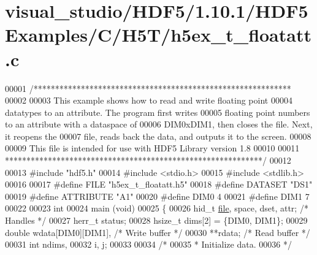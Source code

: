 \hypertarget{visual__studio_2_h_d_f5_21_810_81_2_h_d_f5_examples_2_c_2_h5_t_2h5ex__t__floatatt_8c_source}{}\section{visual\+\_\+studio/\+H\+D\+F5/1.10.1/\+H\+D\+F5\+Examples/\+C/\+H5\+T/h5ex\+\_\+t\+\_\+floatatt.c}
\label{visual__studio_2_h_d_f5_21_810_81_2_h_d_f5_examples_2_c_2_h5_t_2h5ex__t__floatatt_8c_source}

\begin{DoxyCode}
00001 \textcolor{comment}{/************************************************************}
00002 \textcolor{comment}{}
00003 \textcolor{comment}{  This example shows how to read and write floating point}
00004 \textcolor{comment}{  datatypes to an attribute.  The program first writes}
00005 \textcolor{comment}{  floating point numbers to an attribute with a dataspace of}
00006 \textcolor{comment}{  DIM0xDIM1, then closes the file.  Next, it reopens the}
00007 \textcolor{comment}{  file, reads back the data, and outputs it to the screen.}
00008 \textcolor{comment}{}
00009 \textcolor{comment}{  This file is intended for use with HDF5 Library version 1.8}
00010 \textcolor{comment}{}
00011 \textcolor{comment}{ ************************************************************/}
00012 
00013 \textcolor{preprocessor}{#include "hdf5.h"}
00014 \textcolor{preprocessor}{#include <stdio.h>}
00015 \textcolor{preprocessor}{#include <stdlib.h>}
00016 
00017 \textcolor{preprocessor}{#define FILE            "h5ex\_t\_floatatt.h5"}
00018 \textcolor{preprocessor}{#define DATASET         "DS1"}
00019 \textcolor{preprocessor}{#define ATTRIBUTE       "A1"}
00020 \textcolor{preprocessor}{#define DIM0            4}
00021 \textcolor{preprocessor}{#define DIM1            7}
00022 
00023 \textcolor{keywordtype}{int}
00024 main (\textcolor{keywordtype}{void})
00025 \{
00026     hid\_t       \hyperlink{structfile}{file}, space, dset, attr;            \textcolor{comment}{/* Handles */}
00027     herr\_t      status;
00028     hsize\_t     dims[2] = \{DIM0, DIM1\};
00029     \textcolor{keywordtype}{double}      wdata[DIM0][DIM1],                  \textcolor{comment}{/* Write buffer */}
00030                 **rdata;                            \textcolor{comment}{/* Read buffer */}
00031     \textcolor{keywordtype}{int}         ndims,
00032                 i, j;
00033 
00034     \textcolor{comment}{/*}
00035 \textcolor{comment}{     * Initialize data.}
00036 \textcolor{comment}{     */}

\end{DoxyCode}

